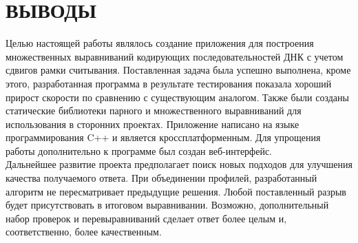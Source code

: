 \newpage
\part*{\large \centering ВЫВОДЫ}
\hspace{\parindent} Целью настоящей работы являлось создание приложения для построения множественных выравниваний кодирующих последовательностей ДНК с учетом сдвигов рамки считывания. Поставленная задача была успешно выполнена, кроме этого, разработанная программа в результате тестирования показала хороший прирост скорости по сравнению с существующим аналогом. Также были созданы статические библиотеки парного и множественного выравниваний для использования в сторонних проектах. Приложение написано на языке программирования C++ и является кроссплатформенным. Для упрощения работы дополнительно к программе был создан веб-интерфейс.\\
\indent Дальнейшее развитие проекта предполагает поиск новых подходов для улучшения качества получаемого ответа. При объединении профилей, разработанный алгоритм не пересматривает предыдущие решения. Любой поставленный разрыв будет присутствовать в итоговом выравнивании. Возможно, дополнительный набор проверок и перевыравниваний сделает ответ более целым и, соответственно, более качественным.